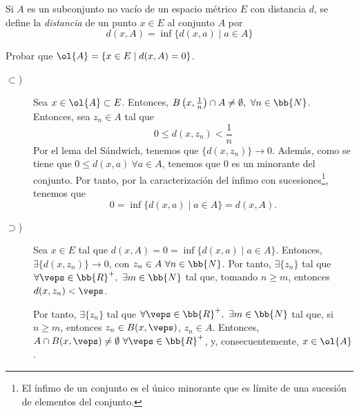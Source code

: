 \begin{ejercicio}
    Si $A$ es un subconjunto no vacío de un espacio métrico $E$ con distancia $d$, se define la \emph{distancia} de un punto $x\in E$ al conjunto $A$ por
    $$d(x,A) = \inf\{ d(x,a) \mid a \in A\}$$

    Probar que $ \ol{A} = \{x \in E \mid d(x,A) = 0\}$.
    \begin{description}
        \item[$\subset$)] Sea $x\in \ol{A}\subset E$. Entonces, $B\left(x,\frac{1}{n}\right)\cap A\neq \emptyset,~\forall n\in \bb{N}$. Entonces, sea $z_n\in A$ tal que
        $$0\leq d\left(x,z_n\right)< \frac{1}{n}$$
        Por el lema del Sándwich, tenemos que $\{d(x,z_n)\}\to 0$. Además, como se tiene que $0\leq d(x,a)~\forall a\in A$, tenemos que $0$ es un minorante del conjunto. Por tanto, por la caracterización del ínfimo con sucesiones\footnote{El ínfimo de un conjunto es el único minorante que es límite de una sucesión de elementos del conjunto.}, tenemos que $$0=\inf\{d(x,a)\mid a\in A\}=d(x,A).$$

        \item[$\supset$)] Sea $x\in E$ tal que $d(x,A)=0=\inf\{d(x,a)\mid a\in A\}$. Entonces, $\exists \{d(x,z_n)\}\to 0$, con $z_n\in A~\forall n\in \bb{N}$. Por tanto, $\exists \{z_n\}$ tal que $\forall \veps\in \bb{R}^+,~\exists m\in \bb{N}$ tal que, tomando $n\geq m$, entonces $d(x,z_n)<\veps$.
        
        Por tanto, $\exists \{z_n\}$ tal que $\forall \veps\in \bb{R}^+,~\exists m\in \bb{N}$ tal que, si $n\geq m$, entonces $z_n\in B(x,\veps)$, $z_n\in A$. Entonces, $A\cap B(x,\veps)\neq \emptyset~\forall \veps\in \bb{R}^+$, y, consecuentemente, $x\in \ol{A}$.
    \end{description}
\end{ejercicio}


